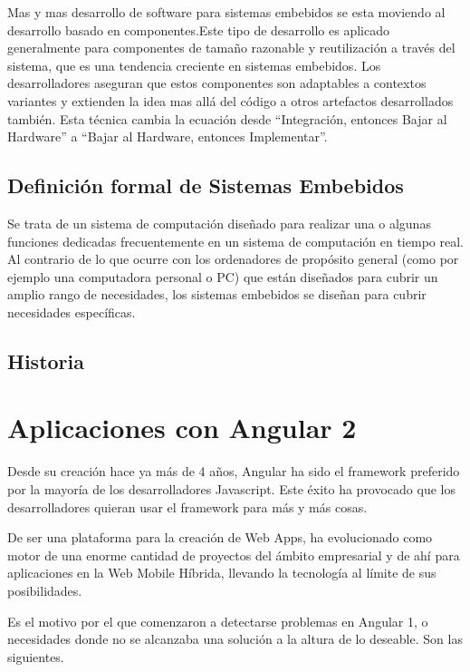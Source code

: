 \documentclass[12pt,twoside]{book}
\begin{document}
Mas y mas desarrollo de software para sistemas embebidos se esta moviendo al desarrollo basado en componentes.Este tipo de desarrollo es aplicado generalmente para componentes de tamaño razonable y reutilización a través del sistema, que es una tendencia creciente en sistemas embebidos. Los desarrolladores aseguran que estos componentes son adaptables a contextos variantes y extienden la idea mas allá del código a otros artefactos desarrollados también. Esta técnica cambia la ecuación desde ``Integración, entonces Bajar al Hardware'' a ``Bajar al Hardware, entonces Implementar''.

\section{Definición formal de Sistemas Embebidos}

Se trata de un sistema de computación diseñado  para realizar una o algunas funciones dedicadas frecuentemente en un sistema de computación en tiempo real. Al contrario de lo que ocurre con los ordenadores de propósito general (como por ejemplo una computadora personal o PC) que están diseñados para cubrir un amplio rango de necesidades, los sistemas embebidos se diseñan para cubrir necesidades específicas.

\section{Historia}

\chapter{Aplicaciones con Angular 2}

Desde su creación hace ya más de 4 años, Angular ha sido el framework preferido por la mayoría de los desarrolladores Javascript. Este éxito ha provocado que los desarrolladores quieran usar el framework para más y más cosas.

De ser una plataforma para la creación de Web Apps, ha evolucionado como motor de una enorme cantidad de proyectos del ámbito empresarial y de ahí para aplicaciones en la Web Mobile Híbrida, llevando la tecnología al límite de sus posibilidades.

Es el motivo por el que comenzaron a detectarse problemas en Angular 1, o necesidades donde no se alcanzaba una solución a la altura de lo deseable. Son las siguientes.
\end{document}
